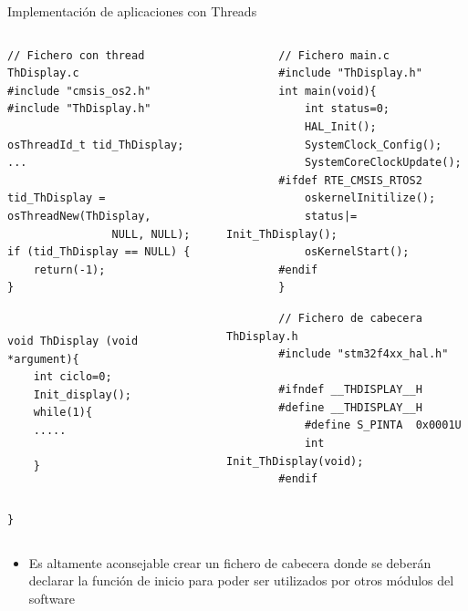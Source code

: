 \begin{frame}[fragile]{Implementación de aplicaciones con Threads}
    \begin{columns}
        \begin{column}{0.50\textwidth}
            \begin{verbatim}
// Fichero con thread ThDisplay.c
#include "cmsis_os2.h"
#include "ThDisplay.h"

osThreadId_t tid_ThDisplay; 
...

tid_ThDisplay = osThreadNew(ThDisplay, 
                NULL, NULL);
if (tid_ThDisplay == NULL) {
    return(-1);
}


void ThDisplay (void *argument){
    int ciclo=0;
    Init_display();
    while(1){
    .....
    
    }
   

}
            \end{verbatim}
        \end{column}
    \begin{column}{0.50\textwidth}
        \begin{verbatim}
        // Fichero main.c
        #include "ThDisplay.h"
        int main(void){
            int status=0;
            HAL_Init();
            SystemClock_Config();
            SystemCoreClockUpdate();
        #ifdef RTE_CMSIS_RTOS2
            oskernelInitilize();
            status|= Init_ThDisplay();
            osKernelStart();
        #endif
        }
        \end{verbatim}
        \begin{verbatim}
        // Fichero de cabecera  ThDisplay.h    
        #include "stm32f4xx_hal.h"
        
        #ifndef __THDISPLAY__H
        #define __THDISPLAY__H
            #define S_PINTA  0x0001U
            int Init_ThDisplay(void);
        #endif
        
        \end{verbatim}
    \end{column}
    \end{columns}
    \begin{itemize}
        \item Es altamente aconsejable crear un fichero de cabecera donde se deberán declarar la función de inicio para poder ser utilizados por otros módulos del software

    \end{itemize}
\end{frame}

